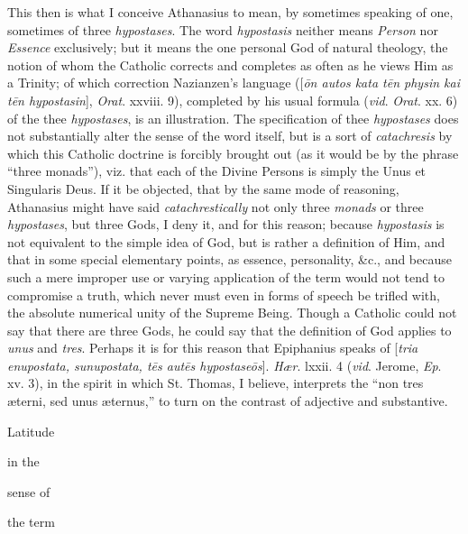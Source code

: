 This then is what I conceive Athanasius to
mean, by sometimes speaking of one, sometimes of three \emph{hypostases}.
The word \emph{hypostasis} neither means \emph{Person} nor \emph{Essence}
exclusively; but it means the one personal God of
natural theology, the notion of whom the Catholic corrects and
completes as often as he views Him as a Trinity; of which
correction Nazianzen's language ([\emph{\={o}n autos kata t\={e}n
physin kai t\={e}n hypostasin}], \emph{Orat}. xxviii.
9), completed by his usual formula (\emph{vid}. \emph{Orat}.
xx. 6) of the thee \emph{hypostases}, is an illustration. The
specification of thee \emph{hypostases} does not substantially
alter the sense of the word itself, but is a sort of \emph{catachresis}
by which this Catholic doctrine is forcibly brought out (as it
would be by the phrase ``three monads''), viz. that each of the
Divine Persons is simply the Unus et Singularis Deus. If it be
objected, that by the same mode of reasoning, Athanasius might
have said \emph{catachrestically} not only three \emph{monads}
or three \emph{hypostases}, but three Gods, I deny it, and for
this reason; because \emph{hypostasis} is not equivalent to
the simple idea of God, but is rather a definition of Him, and
that in some special elementary points, as essence,
personality, \&c., and because such a mere improper use or
varying application of the term would not tend to compromise a
truth, which never must even in forms of speech be trifled
with, the absolute numerical unity of the Supreme Being.
Though a Catholic could not say that there are three Gods, he
could say that the definition of God applies to \emph{unus}
and \emph{tres}. Perhaps it is for this reason that Epiphanius
speaks of [\emph{tria enupostata, sunupostata, t\={e}s aut\={e}s
hypostase\={o}s}]. \emph{Hær}. lxxii. 4 (\emph{vid}.
Jerome, \emph{Ep}. xv. 3), in the spirit in which St. Thomas,
I believe, interprets the ``non tres æterni, sed unus æternus,''
to turn on the contrast of adjective and substantive. 

Latitude

in the

sense of

the term

